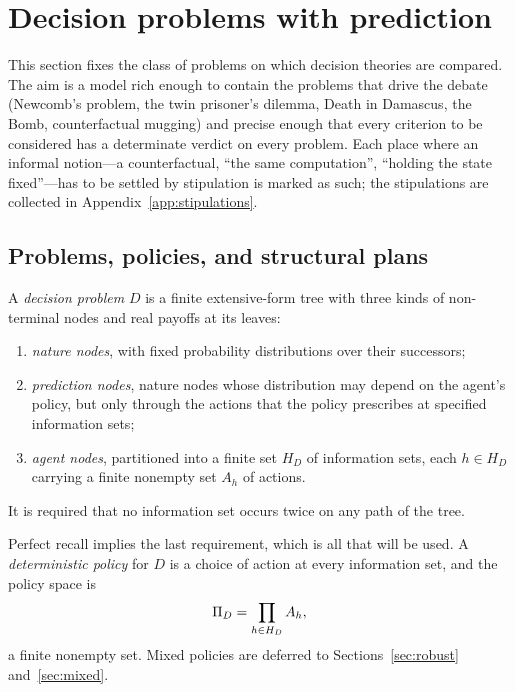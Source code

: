 \section{Decision problems with prediction}\label{sec:model}

This section fixes the class of problems on which decision theories are compared. The aim is a
model rich enough to contain the problems that drive the debate (Newcomb's problem, the twin
prisoner's dilemma, Death in Damascus, the Bomb, counterfactual mugging) and precise enough that
every criterion to be considered has a determinate verdict on every problem. Each place where an
informal notion---a counterfactual, \enquote{the same computation}, \enquote{holding the state
fixed}---has to be settled by stipulation is marked as such; the stipulations are collected in
Appendix~\ref{app:stipulations}.

\subsection{Problems, policies, and structural plans}

\begin{definition}\label{def:problem}
A \emph{decision problem} $D$ is a finite extensive-form tree with three kinds of non-terminal
nodes and real payoffs at its leaves:
\begin{enumerate}[label=(\roman*)]
  \item \emph{nature nodes}, with fixed probability distributions over their successors;
  \item \emph{prediction nodes}, nature nodes whose distribution may depend on the agent's policy,
        but only through the actions that the policy prescribes at specified information sets;
  \item \emph{agent nodes}, partitioned into a finite set $H_D$ of information sets, each $h\in H_D$
        carrying a finite nonempty set $A_h$ of actions.
\end{enumerate}
It is required that no information set occurs twice on any path of the tree.
\end{definition}

Perfect recall implies the last requirement, which is all that will be used. A \emph{deterministic
policy} for $D$ is a choice of action at every information set, and the policy space is
\[
  \Pi_D=\prod_{h\in H_D}A_h,
\]
a finite nonempty set. Mixed policies are deferred to Sections~\ref{sec:robust}
and~\ref{sec:mixed}.


